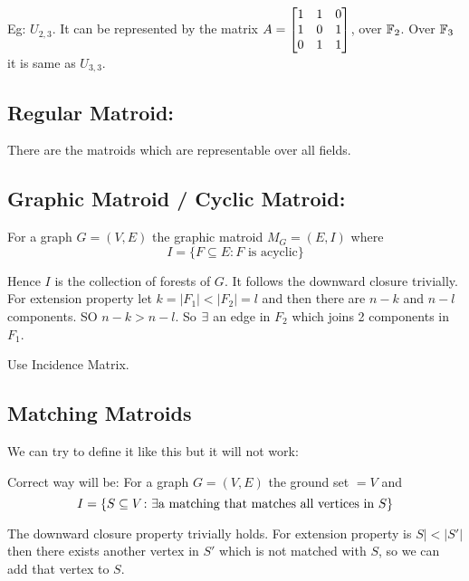 \documentclass{article}
\begin{document}
	Eg: $U_{2,3}$. It can be represented by the matrix $A=\left[\begin{matrix}1&1&0\\ 1& 0 & 1\\ 0& 1& 1\end{matrix}\right]$, over $\mathbb{F}_2$. Over $\mathbb{F}_3$ it is same as $U_{3,3}$. 
	
	\subsection{Regular Matroid:} There are the matroids which are representable over all fields.
	
	\subsection{Graphic Matroid / Cyclic Matroid:} For a graph $G=(V,E)$ the graphic matroid $M_G=(E,I)$ where $$I=\{F\subseteq E\colon \text{$F$ is acyclic}\}$$
	
	Hence $I$ is the collection of forests of $G$. It follows the downward closure trivially. For extension property let $k=|F_1|<|F_2|=l$ and then there are $n-k$ and $n-l$ components. SO $n-k>n-l$. So $\exists$ an edge in $F_2$ which joins 2 components in $F_1$.
	\begin{proof-idea}
		Use Incidence Matrix.
	\end{proof-idea}
	\subsection{Matching Matroids}
	We can try to define it like this but it will not work:
\parinf

Correct way will be: For a graph $G=(V,E)$ the ground set $=V$ and $$I=\{S\subseteq V\colon \exists \text{a matching that matches all vertices in $S$}\}$$\parinn

The downward closure property trivially holds. For extension property is $S|<|S'|$ then there exists another vertex in $S'$ which is not matched with $S$, so we can add that vertex to $S$. 
\end{document}
